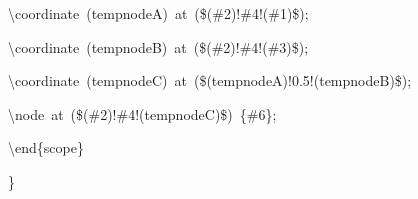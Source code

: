 {{\rule[-0.5ex]{0pt}{2.5ex}\hspace*{2.0em}\textbackslash{}coordinate~(tempnodeA)~at~(\$(\#2)!\#4!(\#1)\$);\\
\rule[-0.5ex]{0pt}{2.5ex}\hspace*{2.0em}\textbackslash{}coordinate~(tempnodeB)~at~(\$(\#2)!\#4!(\#3)\$);\\
\rule[-0.5ex]{0pt}{2.5ex}\hspace*{2.0em}\textbackslash{}coordinate~(tempnodeC)~at~(\$(tempnodeA)!0.5!(tempnodeB)\$);\\
\rule[-0.5ex]{0pt}{2.5ex}\hspace*{2.0em}\textbackslash{}node~at~(\$(\#2)!\#4!(tempnodeC)\$)~\{\#6\};\\
\rule[-0.5ex]{0pt}{2.5ex}\hspace*{1.0em}\textbackslash{}end\{scope\}\\
\rule[-0.5ex]{0pt}{2.5ex}\hspace*{0.0em}\}}%
}%
\endgroup
